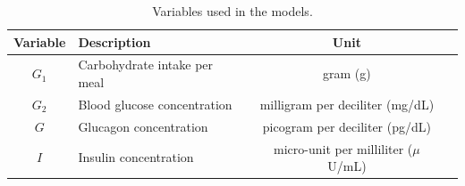 \documentclass[a4paper,fleqn]{cas-sc}
\numberwithin{equation}{section}
\numberwithin{equation}{section}
\newcommand{\1}{\boldsymbol{1}}
\newcommand{\0}{\boldsymbol{0}}
\begin{document}
\begin{table}
    \centering
    \begin{tabular}{clcc}
        \hline
        \textbf{Variable} & \textbf{Description} & \textbf{Unit} \\
        \hline
        $G_1$ & Carbohydrate intake per meal & gram (g) \\ 
        $G_2$ & Blood glucose concentration & milligram per deciliter (mg/dL)\\
        $G$ & Glucagon concentration & picogram per deciliter (pg/dL) \\
        $I$ & Insulin concentration & micro-unit per milliliter (\(\mu\)U/mL) \\
        \hline
    \end{tabular}
    \caption{Variables used in the models.}
    \label{table: variables}
\end{table}
\end{document}
